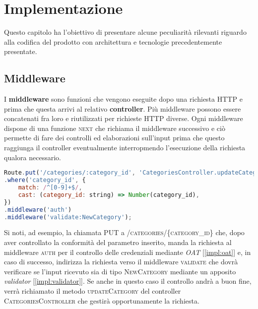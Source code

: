 
\chapter{Implementazione}
\label{cap:implementazione}
Questo capitolo ha l'obiettivo di presentare alcune peculiarità rilevanti riguardo alla codifica del prodotto con architettura e tecnologie precedentemente presentate.

\section{Middleware}
\label{impl:middleware}
I \textbf{middleware} sono funzioni che vengono eseguite dopo una richiesta HTTP e prima che questa arrivi al relativo \textbf{controller}. Più middleware possono essere concatenati fra loro e riutilizzati per richieste HTTP diverse. Ogni middleware dispone di una funzione \textsc{next} che richiama il middleware successivo e ciò permette di fare dei controlli ed elaborazioni sull'input prima che questo raggiunga il controller eventualmente interropmendo l'esecuzione della richiesta qualora necessario.

\begin{lstlisting}[language=JavaScript]
Route.put('/categories/:category_id', 'CategoriesController.updateCategory')
.where('category_id', {
    match: /^[0-9]+$/,
    cast: (category_id: string) => Number(category_id),
})
.middleware('auth')
.middleware('validate:NewCategory');
\end{lstlisting}

Si noti, ad esempio, la chiamata PUT a \textsc{/categories/\{category\_id\}} che, dopo aver controllato la conformità del parametro inserito, manda la richiesta al middleware \textsc{auth} per il controllo delle credenziali mediante \textit{OAT} [\autoref{impl:oat}] e, in caso di successo, indirizza la richiesta verso il middleware \textsc{validate} che dovrà verificare se l'input ricevuto sia di tipo \textsc{NewCategory} mediante un apposito \textit{validator} [\autoref{impl:validator}]. Se anche in questo caso il controllo andrà a buon fine, verrà richiamato il metodo \textsc{updateCategory} del controller \textsc{CategoriesController} che gestirà opportunamente la richiesta.

